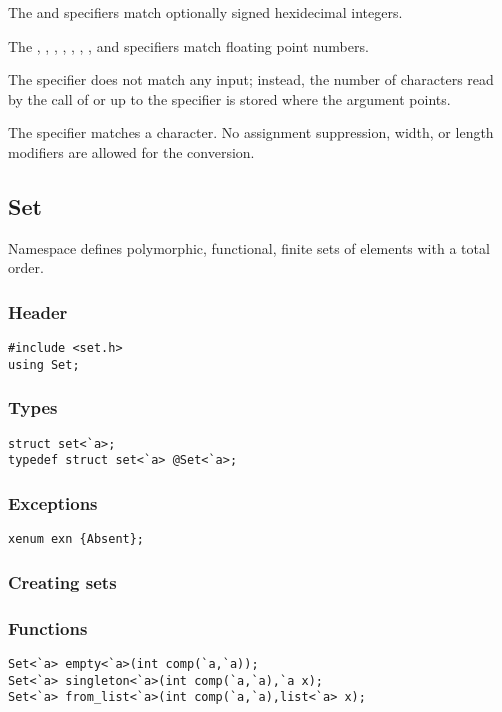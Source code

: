 The  and  specifiers match optionally signed hexidecimal
integers.

The , , , , , ,
, and  specifiers match floating point numbers.

The  specifier does not match any input; instead, the number of
characters read by the call of  or  up to the
 specifier is stored where the argument points.

The \code{\%} specifier matches a \code{\%} character.  No assignment
suppression, width, or length modifiers are allowed for the \code{\%}
conversion.

\subsection{Set}

Namespace  defines polymorphic, functional, finite sets of
elements with a total order.

\subsubsection*{Header}
\begin{verbatim}
#include <set.h>
using Set;
\end{verbatim}

\subsubsection*{Types}
\begin{verbatim}
struct set<`a>;
typedef struct set<`a> @Set<`a>;
\end{verbatim}

\subsubsection*{Exceptions}
\begin{verbatim}
xenum exn {Absent};
\end{verbatim}

\subsubsection*{Creating sets}

\subsubsection*{Functions}
\begin{verbatim}
Set<`a> empty<`a>(int comp(`a,`a));
Set<`a> singleton<`a>(int comp(`a,`a),`a x);
Set<`a> from_list<`a>(int comp(`a,`a),list<`a> x);
\end{verbatim}

